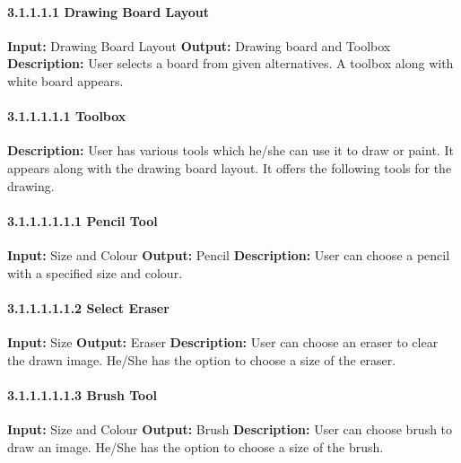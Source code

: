 \documentclass{scrreprt}
\begin{document}
\paragraph{3.1.1.1.1 Drawing Board Layout}
\hfill \vspace{2.5mm} \break 
\textbf{Input:} Drawing Board Layout \newline
\textbf{Output:} Drawing board and Toolbox
\vspace{1mm}\newline
\textbf{Description:} \newline 
User selects a board from given alternatives. A toolbox along with white board appears.

\paragraph{3.1.1.1.1.1 Toolbox}
\hfill \vspace{2.5mm} \break 
\textbf{Description:} \newline
User has various tools which
he/she can use it to draw or paint. It appears along with the drawing board layout. It offers the following tools for the drawing.

\paragraph{3.1.1.1.1.1.1 Pencil Tool}
\hfill \vspace{2.5mm} \break 
\textbf{Input:} Size and Colour \newline
\textbf{Output:} Pencil
\vspace{1mm}\newline
\textbf{Description:} \newline 
User can choose a pencil with a specified size and colour.

\paragraph{3.1.1.1.1.1.2 Select Eraser}
\hfill \vspace{2.5mm} \break 
\textbf{Input:} Size \newline
\textbf{Output:} Eraser
\vspace{1mm}\newline
\textbf{Description:} \newline 
User can choose an eraser to 
clear the drawn image. He/She has the 
option to choose a size of the eraser.


\paragraph{3.1.1.1.1.1.3 Brush Tool}
\hfill \vspace{2.5mm} \break 
\textbf{Input:} Size and Colour \newline
\textbf{Output:} Brush
\vspace{1mm}\newline
\textbf{Description:} \newline 
User can choose brush to draw an image. He/She has the option to choose a size of the brush.
\end{document}

